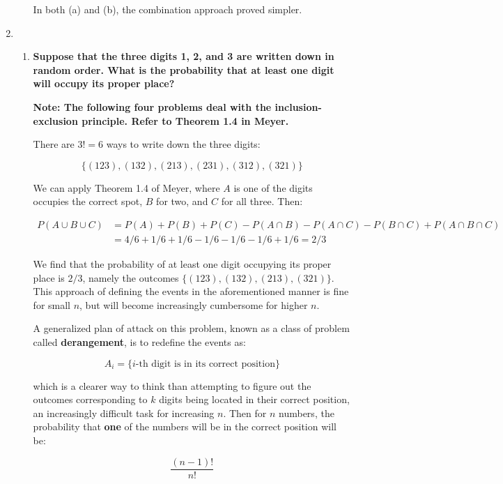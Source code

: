 \documentclass[10pt, oneside]{article}   	%
\theoremstyle{definition}
\begin{document}
\begin{enumerate}[label=2.\arabic*]
\begin{enumerate}
	In both (a) and (b), the combination approach proved simpler. 
	\end{enumerate}
	
\item \begin{enumerate}
	\item \begin{tcolorbox}[
  colback=Cerulean!5!white,
  colframe=Cerulean!75!black]
	\textbf{Suppose that the three digits 1, 2, and 3 are written down in random order. What is the probability that at least one digit will occupy its proper place?}
	\end{tcolorbox}
	
	\textbf{Note: The following four problems deal with the inclusion-exclusion principle. Refer to Theorem 1.4 in Meyer.}
	
	There are $3! = 6$ ways to write down the three digits:
	
	\[ \{ (123), (132), (213), (231), (312), (321) \} \]
	
	We can apply Theorem 1.4 of Meyer, where $A$ is one of the digits occupies the correct spot, $B$ for two, and $C$ for all three. Then:
	
	\begin{align*}
	P(A \cup B \cup C) &= P(A) + P(B) + P(C) - P(A \cap B) - P(A \cap C) - P(B \cap C) + P(A \cap B \cap C) \\
	&= 4/6 + 1/6 + 1/6 - 1/6 - 1/6 - 1/6 + 1/6 = \boxed{2/3}
	\end{align*}
	
	We find that the probability of at least one digit occupying its proper place is $\boxed{2/3}$, namely the outcomes $\{ (123), (132), (213), (321)\}$. This approach of defining the events in the aforementioned manner is fine for small $n$, but will become increasingly cumbersome for higher $n$.
	
	A generalized plan of attack on this problem, known as a class of problem called \textbf{derangement}, is to redefine the events as:
	
	\[ A_i = \{ \text{$i$-th digit is in its correct position} \} \]
	
	which is a clearer way to think than attempting to figure out the outcomes corresponding to $k$ digits being located in their correct position, an increasingly difficult task for increasing $n$. Then for $n$ numbers, the 	probability that \textbf{one} of the numbers will be in the correct position will be:
	
	\[ \frac{(n-1)!}{n!} \]
	

\end{enumerate}
\end{enumerate}
\end{document}
